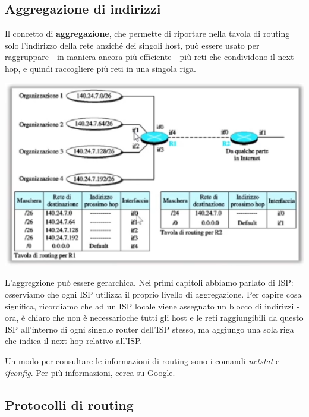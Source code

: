     \subsection{Aggregazione di indirizzi}
    
        Il concetto di \textbf{aggregazione}, che permette di riportare nella tavola di routing solo l'indirizzo della rete anziché dei singoli host, può essere usato per raggruppare - in maniera ancora più efficiente - più reti che condividono il next-hop, e quindi raccogliere più reti in una singola riga.
        
        \begin{center}
            \includegraphics[scale=0.5]{images/Aggregazione.png}
        \end{center}
        
        L'aggregzione può essere gerarchica. Nei primi capitoli abbiamo parlato di ISP: osserviamo che ogni ISP utilizza il proprio livello di aggregazione. Per capire cosa significa, ricordiamo che ad un ISP locale viene assegnato un blocco di indirizzi - ora, è chiaro che non è necessarioche  tutti gli host e le reti raggiungibili da questo ISP all'interno di ogni singolo router dell'ISP stesso, ma aggiungo una sola riga che indica il next-hop relativo all'ISP.
        
        \vspace{3mm}
        
        Un modo per consultare le informazioni di routing sono i comandi \textit{netstat} e \textit{ifconfig}. Per più informazioni, cerca su Google.
        
    \subsection{Protocolli di routing}
    
